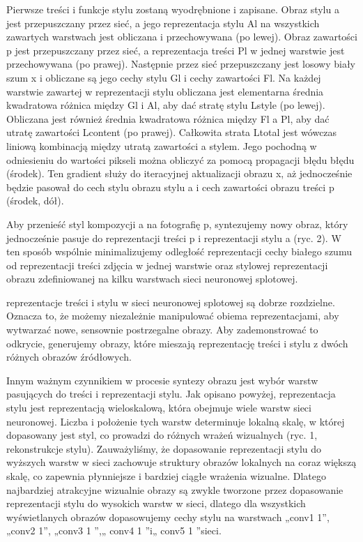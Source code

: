 \documentclass[brudnopis]{xmgr}
\begin{document}
Pierwsze treści i funkcje stylu zostaną wyodrębnione i zapisane. Obraz stylu ⃗a jest przepuszczany przez sieć, a jego reprezentacja stylu Al na wszystkich zawartych warstwach jest obliczana i przechowywana (po lewej). Obraz zawartości p⃗ jest przepuszczany przez sieć, a reprezentacja treści Pl w jednej warstwie jest przechowywana (po prawej). Następnie przez sieć przepuszczany jest losowy biały szum ⃗x i obliczane są jego cechy stylu Gl i cechy zawartości Fl. Na każdej warstwie zawartej w reprezentacji stylu obliczana jest elementarna średnia kwadratowa różnica między Gl i Al, aby dać stratę stylu Lstyle (po lewej). Obliczana jest również średnia kwadratowa różnica między Fl a Pl, aby dać utratę zawartości Lcontent (po prawej). Całkowita strata Ltotal jest wówczas liniową kombinacją między utratą zawartości a stylem. Jego pochodną w odniesieniu do wartości pikseli można obliczyć za pomocą propagacji błędu błędu (środek). Ten gradient służy do iteracyjnej aktualizacji obrazu ⃗x, aż jednocześnie będzie pasował do cech stylu obrazu stylu ⃗a i cech zawartości obrazu treści p (środek, dół).


Aby przenieść styl kompozycji ⃗a na fotografię p⃗, syntezujemy nowy obraz, który jednocześnie pasuje do reprezentacji treści p⃗ i reprezentacji stylu ⃗a (ryc. 2). W ten sposób wspólnie minimalizujemy odległość reprezentacji cechy białego szumu od reprezentacji treści zdjęcia w jednej warstwie oraz stylowej reprezentacji obrazu zdefiniowanej na kilku warstwach sieci neuronowej splotowej.

reprezentacje treści i stylu w sieci neuronowej splotowej są dobrze rozdzielne. Oznacza to, że możemy niezależnie manipulować obiema reprezentacjami, aby wytwarzać nowe, sensownie postrzegalne obrazy. Aby zademonstrować to odkrycie, generujemy obrazy, które mieszają reprezentację treści i stylu z dwóch różnych obrazów źródłowych.


Innym ważnym czynnikiem w procesie syntezy obrazu jest wybór warstw pasujących do treści i reprezentacji stylu. Jak opisano powyżej, reprezentacja stylu jest reprezentacją wieloskalową, która obejmuje wiele warstw sieci neuronowej. Liczba i położenie tych warstw determinuje lokalną skalę, w której dopasowany jest styl, co prowadzi do różnych wrażeń wizualnych (ryc. 1, rekonstrukcje stylu). Zauważyliśmy, że dopasowanie reprezentacji stylu do wyższych warstw w sieci zachowuje struktury obrazów lokalnych na coraz większą skalę, co zapewnia płynniejsze i bardziej ciągłe wrażenia wizualne. Dlatego najbardziej atrakcyjne wizualnie obrazy są zwykle tworzone przez dopasowanie reprezentacji stylu do wysokich warstw w sieci, dlatego dla wszystkich wyświetlanych obrazów dopasowujemy cechy stylu na warstwach „conv1 1”, „conv2 1”, „conv3 1 ”,„ conv4 1 ”i„ conv5 1 ”sieci.
\end{document}
